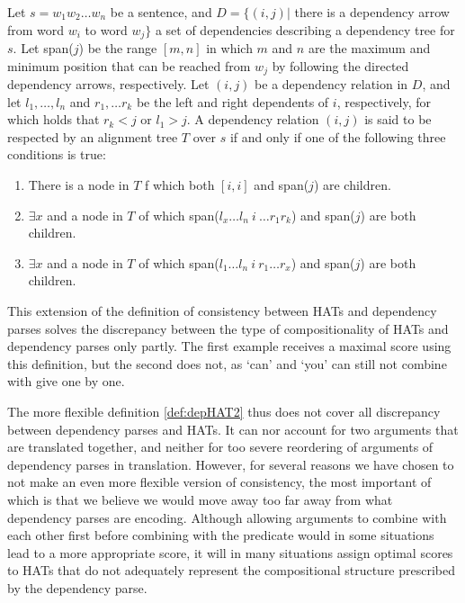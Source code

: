 \begin{definition}[]\label{def:depHAT2}
Let $s = w_1 w_2 \dots w_n$ be a sentence, and $D = \{ (i,j) |$ there is a dependency arrow from word $w_i$ to word $w_j \}$ a set of dependencies describing a dependency tree for $s$. Let span($j$) be the range $[m,n]$ in which $m$ and $n$ are the maximum and minimum position that can be reached from $w_j$ by following the directed dependency arrows, respectively. Let $(i,j)$ be a dependency relation in $D$, and let $l_1,\ldots,l_n$ and $r_1,\ldots r_k$ be the left and right dependents of $i$, respectively, for which holds that $r_k < j$ or $l_1 > j$. A dependency relation $(i,j)$ is said to be respected by an alignment tree $T$ over $s$ if and only if one of the following three conditions is true: \begin{enumerate}
\item There is a node in $T$ f which both $[i,i]$ and span($j$) are children.
\item $\exists x$  and a node in $T$ of which span($l_x\ldots l_n~i~\ldots r_1 r_k$) and span($j$) are both children.
\item $\exists x$  and a node in $T$ of which span($l_1\ldots l_n~i~r_1\ldots r_x$) and span($j$) are both children.
\end{enumerate} 
\end{definition}

This extension of the definition of consistency between HATs and dependency parses solves the discrepancy between the type of compositionality of HATs and dependency parses only partly. The first example receives a maximal score using this definition, but the second does not, as `can' and `you' can still not combine with give one by one. 

The more flexible definition \ref{def:depHAT2} thus does not cover all discrepancy between dependency parses and HATs. It can nor account for two arguments that are translated together, and neither for too severe reordering of arguments of dependency parses in translation. However, for several reasons we have chosen to not make an even more flexible version of consistency, the most important of which is that we believe we would move away too far away from what dependency parses are encoding. Although allowing arguments to combine with each other first before combining with the predicate would in some situations lead to a more appropriate score, it will in many situations assign optimal scores to HATs that do not adequately represent the compositional structure prescribed by the dependency parse.


